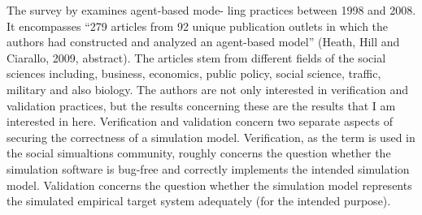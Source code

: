 \documentclass[12pt, english, a4paper]{article}
\begin{document}
The survey by \citet{heath-et-al:2009} examines agent-based mode- ling
practices between 1998 and 2008. It encompasses “279 articles from 92
unique publication outlets in which the authors had constructed and
analyzed an agent-based model” (Heath, Hill and Ciarallo, 2009,
abstract). The articles stem from different fields of the social
sciences including, business, economics, public policy, social
science, traffic, military and also biology. The authors are not only
interested in verification and validation practices, but the results
concerning these are the results that I am interested in
here. Verification and validation concern two separate aspects of
securing the correctness of a simulation model.  Verification,
as the term is used in the social simualtions community, roughly
concerns the question whether the simulation software is bug-free and
correctly implements the intended simulation model. Validation
concerns the question whether the simulation model represents the
simulated empirical target system adequately (for the intended
purpose).
\end{document}
